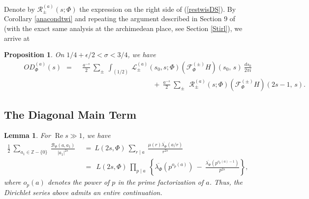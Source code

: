 \documentclass[11pt,reqno]{amsart}
\newtheorem{lem}[thm]{Lemma}
\newtheorem{prop}[thm]{Proposition}
\theoremstyle{definition}
\theoremstyle{definition}
\theoremstyle{remark}
\newcommand{\Z}{\ensuremath{\mathbb{Z}}}
\numberwithin{equation}{section}
\DeclareMathOperator{\re}{Re}
\begin{document}
Denote by $\mathcal{R}_{\pm}^{(a)}(s; \Phi)$ the expression on the right side of (\ref{restwisDS}).   By Corollary \ref{anacondtwi} and repeating the argument described in Section 9 of \cite{Kw23} (with the exact same  analysis at the archimedean place, see Section \ref{Stirl}), we arrive at
\begin{prop}\label{repaCarg}
	On $1/4+\epsilon/2< \sigma < 3/4$, we have
	\begin{align}
	\hspace{30pt} 	OD_{\Phi}^{(a)}(s) \ \ = \ \   &\frac{a^{-s}}{2} \  \sum_{\pm} \  \int_{(1/2)} \  	\mathcal{L}^{(a)}_{\pm}\left(s_{0}, s; \Phi \right)   (\mathcal{F}_{\Phi}^{(\pm)}H)\left(s_{0}, \, s\right) \ \frac{ds_{0}}{2\pi i} \nonumber\\
		&\hspace{120pt} \ + \  \frac{a^{-s}}{2}  \ \sum_{\pm} \  \  \mathcal{R}_{\pm}^{(a)}(s; \Phi) (\mathcal{F}_{\Phi}^{(\pm)} H)\left(2s-1,\,   s\right). 
	\end{align}
\end{prop}




 	 
 	 
\subsection{The Diagonal Main Term}
 	 
 	 \begin{lem}\label{hecdoub}
 	 	For $\re s \gg 1$, we have
 	 	\begin{align}\label{twisdiaDS}
 	 		\frac{1}{2} \ \sum_{a_{1} \in \Z-\{0\}} \ \frac{\mathcal{B}_{\Phi}(a, a_{1})}{|a_{1} |^{2s}} \ \ &= \   L(2s, \Phi)  \  \sum_{r\mid a}  \ \frac{\mu(r) \overline{\lambda_{\Phi}}(a/r)}{r^{2s}} \nonumber\\
 	 		\  \ &= \  \  L(2s, \Phi)  \ \prod_{p\mid a} \ \left\{   \overline{\lambda_{\Phi}}\left(p^{o_{p}(a)}\right) \ - \   \frac{\overline{\lambda_{\Phi}}\left(p^{o_{p}(a)-1}\right) }{p^{2s}} \right\}, 
 	 	\end{align}
  	where $o_{p}(a)$ denotes the power of $p$ in the prime factorization of $a$.  Thus,  the  Dirichlet series above  admits an entire continuation.  
 	 	
 	 	
 	 \end{lem}
 	 
\end{document}
